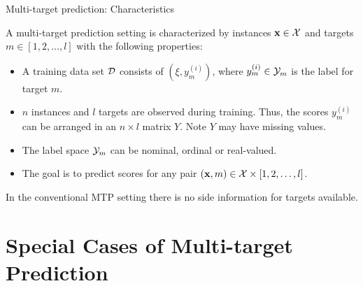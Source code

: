 \documentclass[11pt,compress,t,notes=noshow, xcolor=table]{beamer}
\newcommand{\yim}{y^{(i)}_m}
\begin{document}
\begin{frame}{Multi-target prediction: Characteristics}

	\small
		A multi-target prediction setting is characterized by instances $\mathbf{x} \in \mathcal{X}$ and targets $m \in [1, 2, \ldots, l]$ with the following properties: 

		\begin{itemize} \small
	
			\item A training data set $\mathcal{D}$ consists of $(\xi, \yim)$, where $\yim \in \Yspace_m$ is the label for target $m$.  
			
			\item $n$ instances and $l$ targets are observed during training. Thus, the scores $\yim$ can be arranged in an $n \times l$ matrix $Y$. Note $Y$ may have missing values.
	
			\item The label space $\mathcal{Y}_m$ can be nominal, ordinal or real-valued.  
		
			\item The goal is to predict scores for any pair $(\mathbf{x}, m) \in \mathcal{X} \times [1, 2, \ldots, l]$.  
            \vspace{10pt}
		
		\end{itemize}
% 
%
In the conventional MTP setting there is no side information for targets available. 
%	
%
\end{frame}

\section{Special Cases of Multi-target Prediction}
\end{document}

